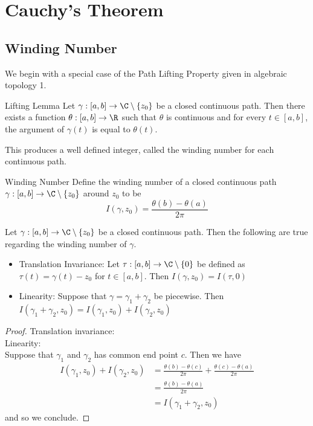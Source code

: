 \documentclass[a4paper]{article}
\begin{document}
\pagebreak
\section{Cauchy's Theorem}
\subsection{Winding Number}
We begin with a special case of the Path Lifting Property given in algebraic topology 1. 

\begin{thm}{Lifting Lemma}{} Let $\gamma:[a,b]\to\C\setminus\{z_0\}$ be a closed continuous path. Then there exists a function $\theta:[a,b]\to\R$ such that $\theta$ is continuous and for every $t\in[a,b]$, the argument of $\gamma(t)$ is equal to $\theta(t)$. 
\end{thm}

This produces a well defined integer, called the winding number for each continuous path. 

\begin{defn}{Winding Number}{} Define the winding number of a closed continuous path $\gamma:[a,b]\to\C\setminus\{z_0\}$ around $z_0$ to be $$I(\gamma,z_0)=\frac{\theta(b)-\theta(a)}{2\pi}$$
\end{defn}

\begin{prp}{}{} Let $\gamma:[a,b]\to\C\setminus\{z_0\}$ be a closed continuous path. Then the following are true regarding the winding number of $\gamma$. 
\begin{itemize}
\item Translation Invariance: Let $\tau:[a,b]\to\C\setminus\{0\}$ be defined as $\tau(t)=\gamma(t)-z_0$ for $t\in[a,b]$. Then $I(\gamma,z_0)=I(\tau,0)$
\item Linearity: Suppose that $\gamma=\gamma_1+\gamma_2$ be piecewise. Then $I(\gamma_1+\gamma_2,z_0)=I(\gamma_1,z_0)+I(\gamma_2,z_0)$
\end{itemize}
\begin{proof}
Translation invariance: \\
Linearity: \\
Suppose that $\gamma_1$ and $\gamma_2$ has common end point $c$. Then we have
\begin{align*}
I(\gamma_1,z_0)+I(\gamma_2,z_0)&=\frac{\theta(b)-\theta(c)}{2\pi}+\frac{\theta(c)-\theta(a)}{2\pi}\\
&=\frac{\theta(b)-\theta(a)}{2\pi}\\
&=I(\gamma_1+\gamma_2,z_0)
\end{align*}
and so we conclude. 
\end{proof}
\end{prp}
\end{document}
